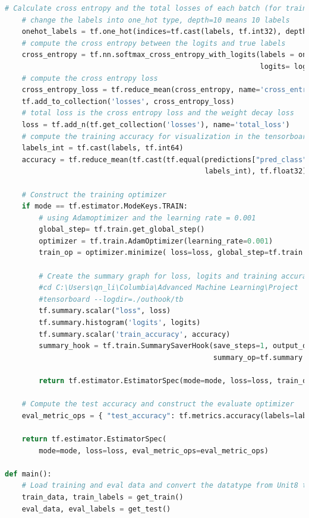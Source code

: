\documentclass[hyperref]{article}
\theoremstyle{nonumberplain}
\begin{document}
\begin{appendices}
\begin{lstlisting}[language=Python]
    # Calculate cross entropy and the total losses of each batch (for training steps)
    # change the labels into one_hot type, depth=10 means 10 labels
    onehot_labels = tf.one_hot(indices=tf.cast(labels, tf.int32), depth=10)
    # compute the cross entropy between the logits and true labels
    cross_entropy = tf.nn.softmax_cross_entropy_with_logits(labels = onehot_labels,
                                                            logits= logits)
    # compute the cross entropy loss
    cross_entropy_loss = tf.reduce_mean(cross_entropy, name='cross_entropy_loss')
    tf.add_to_collection('losses', cross_entropy_loss)
    # total loss is the cross entropy loss and the weight decay loss
    loss = tf.add_n(tf.get_collection('losses'), name='total_loss')
    # compute the training accuracy for visualization in the tensorboard
    labels_int = tf.cast(labels, tf.int64)
    accuracy = tf.reduce_mean(tf.cast(tf.equal(predictions["pred_class"],
                                               labels_int), tf.float32))

    # Construct the training optimizer
    if mode == tf.estimator.ModeKeys.TRAIN:
        # using Adamoptimizer and the learning rate = 0.001
        global_step= tf.train.get_global_step()
        optimizer = tf.train.AdamOptimizer(learning_rate=0.001)
        train_op = optimizer.minimize( loss=loss, global_step=tf.train.get_global_step())

        # Create the summary graph for loss, logits and training accuracy
        #cd C:\Users\qn_li\Columbia\Advanced Machine Learning\Project
        #tensorboard --logdir=./outhook/tb
        tf.summary.scalar("loss", loss)
        tf.summary.histogram('logits', logits)
        tf.summary.scalar('train_accuracy', accuracy)
        summary_hook = tf.train.SummarySaverHook(save_steps=1, output_dir='./outhook/tb',
                                                 summary_op=tf.summary.merge_all())

        return tf.estimator.EstimatorSpec(mode=mode, loss=loss, train_op=train_op, training_hooks=[summary_hook])

    # Compute the test accuracy and construct the evaluate optimizer
    eval_metric_ops = { "test_accuracy": tf.metrics.accuracy(labels=labels, predictions=predictions["pred_class"])}

    return tf.estimator.EstimatorSpec(
        mode=mode, loss=loss, eval_metric_ops=eval_metric_ops)

def main():
    # Load training and eval data and convert the datatype from Unit8 to float32
    train_data, train_labels = get_train()
    eval_data, eval_labels = get_test()


\end{lstlisting}
\end{appendices}
\end{document}
